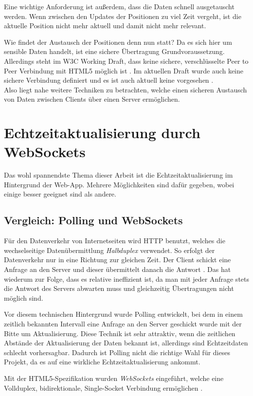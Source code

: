 Eine wichtige Anforderung ist außerdem, dass die Daten schnell ausgetauscht werden. Wenn zwischen den Updates der Positionen zu viel Zeit vergeht, ist die aktuelle Position nicht mehr aktuell und damit nicht mehr relevant.\par

Wie findet der Austausch der Positionen denn nun statt? Da es sich hier um sensible Daten handelt, ist eine sichere Übertragung Grundvoraussetzung. Allerdings steht im W3C Working Draft, dass keine sichere, verschlüsselte Peer to Peer Verbindung mit HTML5 möglich ist \cite{w3cworkingdraft}. Im aktuellen Draft wurde auch keine sichere Verbindung definiert und es ist auch aktuell keine vorgesehen \cite{w3ccurrent}.\\
Also liegt nahe weitere Techniken zu betrachten, welche einen sicheren Austausch von Daten zwischen Clients über einen Server ermöglichen.

\section{Echtzeitaktualisierung durch WebSockets}
Das wohl spannendste Thema dieser Arbeit ist die Echtzeitaktualisierung im Hintergrund der Web-App. Mehrere Möglichkeiten sind dafür gegeben, wobei einige besser geeignet sind als andere.

\subsection{Vergleich: Polling und WebSockets}
Für den Datenverkehr von Internetseiten wird HTTP benutzt, welches die wechselseitige Datenübermittlung \emph{Halbduplex} verwendet. So erfolgt der Datenverkehr nur in eine Richtung zur gleichen Zeit. Der Client schickt eine Anfrage an den Server und dieser übermittelt danach die Antwort \cite[S. xx]{ws}. Das hat wiederum zur Folge, dass es relative ineffizient ist, da man mit jeder Anfrage stets die Antwort des Servers abwarten muss und gleichzeitig Übertragungen nicht möglich sind.\par

Vor diesem technischen Hintergrund wurde Polling entwickelt, bei dem in einem zeitlich bekannten Intervall eine Anfrage an den Server geschickt wurde mit der Bitte um Aktualisierung. Diese Technik ist sehr attraktiv, wenn die zeitlichen Abstände der Aktualisierung der Daten bekannt ist, allerdings sind Echtzeitdaten schlecht vorhersagbar. Dadurch ist Polling nicht die richtige Wahl für dieses Projekt, da es auf eine wirkliche Echtzeitaktualisierung ankommt.\par

Mit der HTML5-Spezifikation wurden \emph{WebSockets} eingeführt, welche eine Vollduplex, bidirektionale, Single-Socket Verbindung ermöglichen \cite[S. Introducing WebSocket]{ws}. 




























